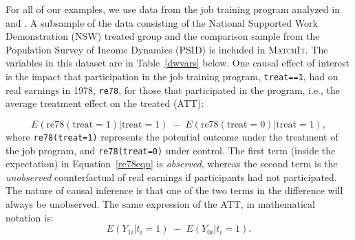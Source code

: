 \documentclass[oneside,letterpaper,titlepage]{article}
\newcommand{\MatchIt}{\textsc{MatchIt}}
\begin{document}
For all of our examples, we use data from the job training program
analyzed in \citet{lalonde86} and \citet{DehWah99}.  A subsample of
the data consisting of the National Supported Work Demonstration (NSW)
treated group and the comparison sample from the Population Survey of
Income Dynamics (PSID) is included in \MatchIt.  The variables in this
dataset are in Table~\ref{dwvars} below.  One causal effect of
interest is the impact that participation in the job training program,
\texttt{treat==1}, had on real earnings in 1978, \texttt{re78}, for
those that participated in the program, i.e., the average treatment
effect on the treated (ATT):

\begin{equation}\label{re78eqn}
E(\text{re78}(\text{treat}=1) | \text{treat}=1)\; - \; E(\text{re78}(\text{treat}=0) | \text{treat}=1),
\end{equation}
where \texttt{re78(treat=1)} represents the potential outcome under
the treatment of the job program, and \texttt{re78(treat=0)} under
control.  The first term (inside the expectation) in
Equation~\ref{re78eqn} is \emph{observed}, whereas the second term is
the \emph{unobserved} counterfactual of real earnings if participants
had not participated.  The nature of causal inference is that one of
the two terms in the difference will always be unobserved.  The same
expression of the ATT, in mathematical notation is:
\begin{equation}
  E(Y_{1i} | t_i=1 ) \; - \; E(Y_{0i} | t_i=1).
\end{equation}
\end{document}
